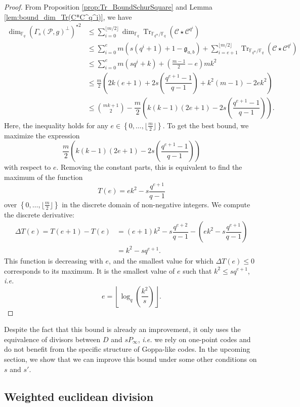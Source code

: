 \documentclass[a4paper]{article}
\theoremstyle{definition}
\theoremstyle{remark}
\newcommand{\calP}{\mathcal{P}}
\newcommand{\calC}{\mathcal{C}}
\newcommand{\fq}{\mathbb{F}_{q}}
\newcommand{\Tr}[1]{\operatorname{Tr}_{\mathbb{F}_{q^m}/\fq}\left(#1\right)}
\newcommand{\set}[1]{\left\{#1\right\}}
\begin{document}
\begin{proof}
    From Proposition \ref{prop:Tr_BoundSchurSquare} and Lemma \ref{lem:bound_dim_Tr(C*C^q^i)}, we have 
    \begin{align*}
        \dim_{\fq}(\Gamma_s(\calP,g)^{\perp})^{\star 2}
        & \leq \sum\limits_{i=0}^{\lfloor m/2 \rfloor} \dim_{\fq} \Tr{\calC \star \calC^{q^i}} \\
        & \leq \sum\limits_{i=0}^{e} m(s(q^i+1)+1-\mathfrak{g}_{a,b})  + \sum\limits_{i=e+1}^{\lfloor m/2 \rfloor} \Tr{\calC \star \calC^{q^i}} \\
        & \leq \sum\limits_{i=0}^{e} m(sq^i+k) + \left( \frac{m-1}{2} -e \right)mk^2 \\
        & \leq \frac{m}{2}\left(2k(e+1)+2s\left(\dfrac{q^{e+1}-1}{q-1}\right)+k^2(m-1)-2ek^2  \right) \\
        & \leq \binom{mk+1}{2} -  \dfrac{m}{2}\left(k(k-1)(2e+1)-2s\left(\dfrac{q^{e+1}-1}{q-1}\right)\right).
    \end{align*}
Here, the inequality holds for any $e \in \set{0,\dots,\lfloor \frac{m}{2} \rfloor}$. To get the best bound, we maximize the expression $$ \dfrac{m}{2}\left(k(k-1)(2e+1)-2s\left(\dfrac{q^{e+1}-1}{q-1}\right)\right)$$ with respect to $e$. Removing the constant parts, this is equivalent to find the maximum of the function
$$T(e) = ek^2-s\dfrac{q^{e+1}}{q-1}$$
over $\set{0,\dots,\lfloor \frac{m}{2} \rfloor}$ in the discrete domain of non-negative integers.  
We compute the discrete derivative:
\begin{align*}
    \Delta T(e) = T(e+1)-T(e) &= (e+1)k^2-s\dfrac{q^{e+2}}{q-1} - \left(ek^2-s\dfrac{q^{e+1}}{q-1}\right) \\
                              &= k^2 - sq^{e+1}.
\end{align*}
This function is decreasing with $e$, and the smallest value for which $\Delta T(e) \leq 0$ corresponds to its maximum. It is the smallest value of $e$ such that $k^2 \leq sq^{e+1}$, \emph{i.e.}
$$e =  \left\lfloor \log_q\left(\dfrac{k^2}{s}\right)\right\rfloor.$$
\end{proof}

Despite the fact that this bound is already an improvement, it only uses the equivalence of divisors between $D$ and $sP_{\infty}$, \emph{i.e.} we rely on one-point codes and do not benefit from the specific structure of Goppa-like codes. In the upcoming section, we show that we can improve this bound under some other conditions on $s$ and $s'$.

\subsection{Weighted euclidean division}
\end{document}
